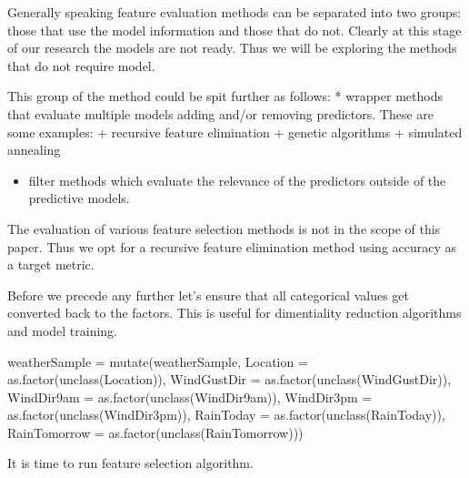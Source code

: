Generally speaking feature evaluation methods can be separated into two
groups: those that use the model information and those that do not.
Clearly at this stage of our research the models are not ready. Thus we
will be exploring the methods that do not require model.

This group of the method could be spit further as follows: * wrapper
methods that evaluate multiple models adding and/or removing predictors.
These are some examples: + recursive feature elimination + genetic
algorithms + simulated annealing

\begin{itemize}
\tightlist
\item
  filter methods which evaluate the relevance of the predictors outside
  of the predictive models.
\end{itemize}

The evaluation of various feature selection methods is not in the scope
of this paper. Thus we opt for a recursive feature elimination method
using accuracy as a target metric.

Before we precede any further let's ensure that all categorical values
get converted back to the factors. This is useful for dimentiality
reduction algorithms and model training.

\begin{Schunk}
\begin{Sinput}
weatherSample = mutate(weatherSample, Location = as.factor(unclass(Location)), 
          WindGustDir = as.factor(unclass(WindGustDir)),
          WindDir9am = as.factor(unclass(WindDir9am)), WindDir3pm = as.factor(unclass(WindDir3pm)),
          RainToday = as.factor(unclass(RainToday)), RainTomorrow = as.factor(unclass(RainTomorrow)))
\end{Sinput}
\end{Schunk}

It is time to run feature selection algorithm.

